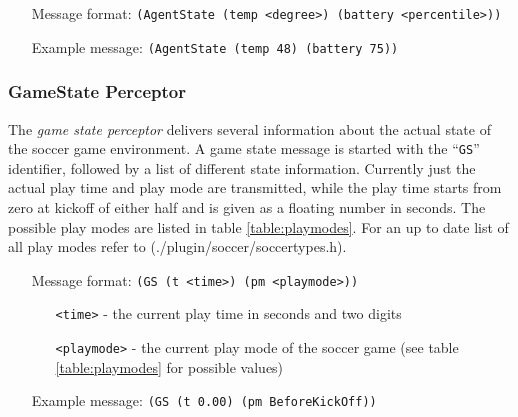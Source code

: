 \begin{itemize}
	\item[Message format:] \texttt{(AgentState (temp <degree>) (battery <percentile>))}
	\item[Example message:] \texttt{(AgentState (temp 48) (battery 75))}
\end{itemize}



\subsubsection{GameState Perceptor}
\label{sec:gamestateperceptor}
The \emph{game state perceptor} delivers several information about the actual
state of the soccer game environment. A game state message is started with the
``\texttt{GS}'' identifier, followed by a list of different state information.
Currently just the actual play time and play mode are transmitted, while the
play time starts from zero at kickoff of either half and is given as a floating
number in seconds. The possible play modes are listed in table
\ref{table:playmodes}. For an up to date list of all play modes refer to
(./plugin/soccer/soccertypes.h).

\begin{itemize}
	\item[Message format:] \texttt{(GS (t <time>) (pm <playmode>))}
	  \begin{itemize}
	    \item[\texttt{<time>} -] the current play time in seconds and two digits
	    \item[\texttt{<playmode>} -] the current play mode of the soccer game (see
	    table \ref{table:playmodes} for possible values)
	  \end{itemize}
	\item[Example message:] \texttt{(GS (t 0.00) (pm BeforeKickOff))}
\end{itemize}

